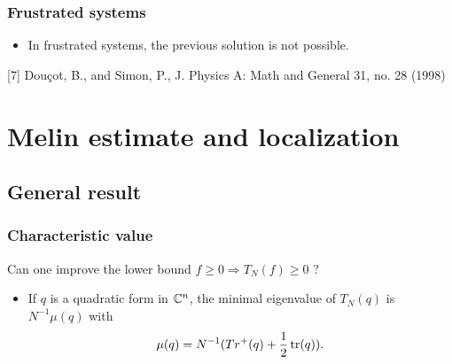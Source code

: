 \documentclass[mathserif]{beamer}
\begin{document}
\begin{frame}
  \frametitle{Frustrated systems}
  \begin{itemize}
  \item In frustrated systems, the previous solution is not possible.
  \end{itemize}
\vspace{1em}

\small{[7] Douçot, B., and Simon, P.,  J. Physics A: Math and General 31, no. 28 (1998)}

\end{frame}

\section{Melin estimate and localization}
\subsection{General result}
\begin{frame}
  \frametitle{Characteristic value}
  Can one improve the lower bound $f\geq 0\Rightarrow T_N(f)\geq 0$ ?
  \begin{itemize}
  \item If $q$ is a quadratic form in $\mathbb{C}^n$, the minimal eigenvalue
    of $T_N(q)$ is $N^{-1}\mu(q)$ with $$\mu(q)=N^{-1}(Tr^+(q)+\frac
    12 \operatorname{tr}(q)).$$

\end{itemize}
\end{frame}
\end{document}
